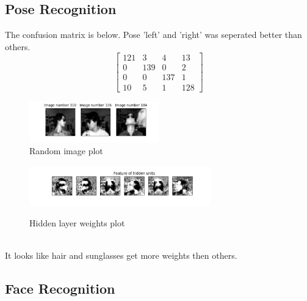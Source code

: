 \documentclass[a4paper]{article}
\begin{document}
\subsection{Pose Recognition}
The confusion matrix is below. Pose 'left' and 'right' was seperated better than others.\\
\[
\begin{bmatrix}
  121 & 3 & 4 & 13 \\
  0 & 139 & 0 & 2 \\
  0 & 0 & 137 & 1 \\
  10 & 5 & 1 & 128
\end{bmatrix}
\]
\begin{figure}[h]
  \begin{center}
  \includegraphics[width=0.5\textwidth]{ex_2_1_random.png}\\
  \caption{Random image plot}
  \includegraphics[width=0.7\textwidth]{ex_2_1_hidden.png}\\
  \caption{Hidden layer weights plot}
  \end{center}
\end{figure}\\
It looks like hair and sunglasses get more weights then others.
\clearpage
\subsection{Face Recognition}
\end{document}
